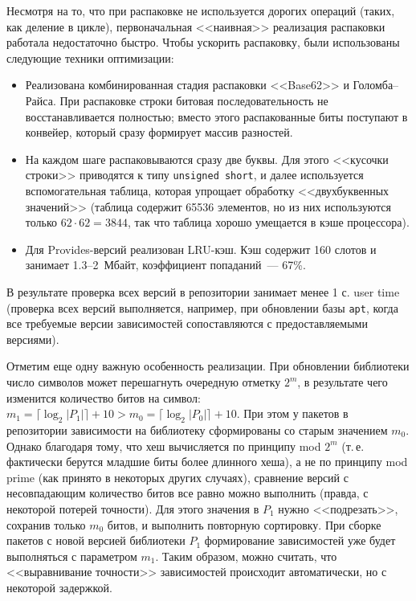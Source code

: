 \documentclass[russian,a4paper,12pt,titlepage]{article}
\begin{document}
Несмотря на то, что при распаковке не используется дорогих операций (таких, как деление в цикле),
первоначальная <<наивная>> реализация распаковки работала недостаточно быстро.  Чтобы ускорить распаковку,
были использованы следующие техники оптимизации:
\begin{itemize}
\item Реализована комбинированная стадия распаковки <<Base62>> и Голомба--Райса.
При распаковке строки битовая последовательность не восстанавливается полностью;
вместо этого распакованные биты поступают в конвейер, который сразу формирует массив разностей.
\item На каждом шаге распаковываются сразу две буквы.  Для этого <<кусочки строки>> приводятся к типу \texttt{unsigned short},
и далее используется вспомогательная таблица, которая упрощает обработку <<двухбуквенных значений>> (таблица содержит 65536
элементов, но из них используются только $62\cdot62=3844$, так что таблица хорошо умещается в кэше процессора).
\item Для Provides-версий реализован LRU-кэш.  Кэш содержит 160 слотов и занимает 1.3--2~Мбайт, коэффициент попаданий~--- 67\%.
\end{itemize}
В результате проверка всех версий в репозитории занимает менее 1 с. user time (проверка всех версий выполняется, например,
при обновлении базы \verb|apt|, когда все требуемые версии зависимостей сопоставляются с предоставляемыми версиями).

Отметим еще одну важную особенность реализации.  При обновлении библиотеки число символов может перешагнуть
очередную отметку $2^m$, в результате чего изменится количество битов на символ:
$m_1=\lceil\log_2|P_1|\rceil+10 > m_0=\lceil\log_2|P_0|\rceil+10$.  При этом у пакетов в репозитории
зависимости на библиотеку сформированы со старым значением $m_0$.  Однако благодаря тому, что хеш вычисляется
по принципу mod $2^m$ (т.\,е. фактически берутся младшие биты более длинного хеша), а не по принципу mod prime
(как принято в некоторых других случаях), сравнение версий с несовпадающим количество битов все равно можно выполнить (правда,
с некоторой потерей точности).  Для этого значения в $P_1$ нужно <<подрезать>>, сохранив только $m_0$ битов, и выполнить
повторную сортировку.  При сборке пакетов с новой версией библиотеки $P_1$ формирование зависимостей уже будет выполняться
с параметром $m_1$.  Таким образом, можно считать, что <<выравнивание точности>> зависимостей происходит автоматически,
но с некоторой задержкой.
\end{document}
